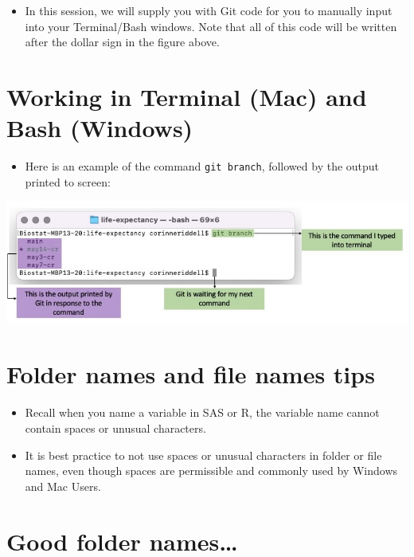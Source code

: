 \documentclass[
]{book}
\providecommand{\tightlist}{%
  \setlength{\itemsep}{0pt}\setlength{\parskip}{0pt}}
\begin{document}
\begin{itemize}
\tightlist
\item
  In this session, we will supply you with Git code for you to manually input
  into your Terminal/Bash windows. Note that all of this code will be written after
  the dollar sign in the figure above.
\end{itemize}

\hypertarget{working-in-terminal-mac-and-bash-windows-1}{%
\section{Working in Terminal (Mac) and Bash (Windows)}\label{working-in-terminal-mac-and-bash-windows-1}}

\begin{itemize}
\tightlist
\item
  Here is an example of the command \texttt{git\ branch}, followed by the output printed
  to screen:
\end{itemize}

\includegraphics[width=1\linewidth]{./figures/Terminal-explainer-2}

\hypertarget{folder-names-and-file-names-tips}{%
\section{Folder names and file names tips}\label{folder-names-and-file-names-tips}}

\begin{itemize}
\tightlist
\item
  Recall when you name a variable in SAS or R, the variable name cannot
  contain spaces or unusual characters.
\item
  It is best practice to not use spaces or unusual characters in folder
  or file names, even though spaces are permissible and commonly used by Windows
  and Mac Users.
\end{itemize}

\hypertarget{good-folder-names}{%
\section{Good folder names\ldots{}}\label{good-folder-names}}
\end{document}
